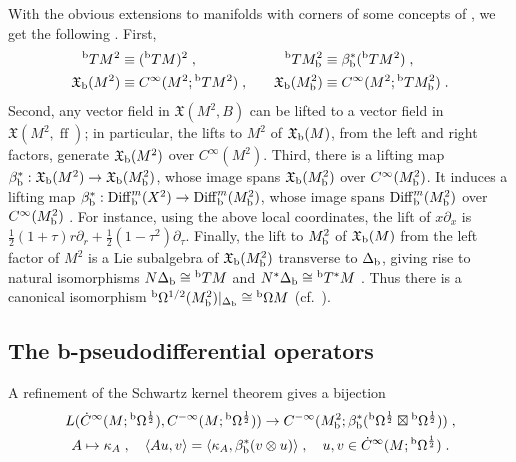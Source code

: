 \documentclass{memo-l}
\theoremstyle{plain}
\theoremstyle{definition}
\theoremstyle{remark}
\newcommand{\fX}{\mathfrak{X}}
\newcommand{\Diff}{\operatorname{Diff}}
\newcommand{\ff}{\operatorname{ff}}
\newcommand{\bOmega}{{}^{\text{\rm b}}\Omega}
\newcommand{\bT}{{}^{\text{\rm b}}T}
\newcommand{\Diffb}{\Diff_{\text{\rm b}}}
\newcommand{\Deltab}{\Delta_{\text{\rm b}}}
\newcommand{\fXb}{\fX_{\text{\rm b}}}
\numberwithin{section}{chapter}
\numberwithin{equation}{section}%
\begin{document}
With the obvious extensions to manifolds with corners of some concepts of , we get the following \cite[Section~4.5]{Melrose1993}. First,
\begin{alignat*}{2}
\bT M^2&\equiv(\bT M)^2\;,&\quad\bT M^2_{\text{\rm b}}&\equiv\beta_{\text{\rm b}}^*(\bT M^2)\;,\\
\fXb(M^2)&\equiv C^\infty(M^2;\bT M^2)\;,&\quad \fXb(M^2_{\text{\rm b}})&\equiv C^\infty(M^2;\bT M^2_{\text{\rm b}})\;. 
\end{alignat*}
Second, any vector field in $\fX(M^2,B)$ can be lifted to a vector field in $\fX(M^2,\ff)$; in particular, the lifts to $M^2$ of $\fXb(M)$, from the left and right factors, generate $\fXb(M^2)$ over $C^\infty(M^2)$. Third, there is a lifting map $\beta_{\text{\rm b}}^*:\fXb(M^2)\to\fXb(M^2_{\text{\rm b}})$, whose image spans $\fXb(M^2_{\text{\rm b}})$ over $C^\infty(M^2_{\text{\rm b}})$. It induces a lifting map $\beta_{\text{\rm b}}^*:\Diffb^m(X^2)\to\Diffb^m(M^2_{\text{\rm b}})$, whose image spans $\Diffb^m(M^2_{\text{\rm b}})$ over $C^\infty(M^2_{\text{\rm b}})$ \cite[Exercise~4.11]{Melrose1993}. For instance, using the above local coordinates, the lift of $x\partial_x$ is $\frac{1}{2}(1+\tau)r\partial_r+\frac{1}{2}(1-\tau^2)\partial_\tau$. Finally, the lift to $M^2_{\text{\rm b}}$ of $\fXb(M)$ from the left factor of $M^2$ is a Lie subalgebra of $\fXb(M^2_{\text{\rm b}})$ transverse to $\Deltab$, giving rise to natural isomorphisms $N\Deltab\cong\bT M$ and $N^*\Deltab\cong\bT ^*M$ \cite[Lemmas~4.5 and~4.6]{Melrose1993}. Thus there is a canonical isomorphism $\bOmega^{1/2}(M^2_{\text{\rm b}})|_{\Deltab}\cong\bOmega M$ (cf.\ \cite[Eq.~(4.125)]{Melrose1993}).



\subsection{The b-pseudodifferential operators}\label{ss: b-pseudodiff opers}

A refinement of the Schwartz kernel theorem gives a bijection \cite[Lemma~4.20]{Melrose1993}
\begin{gather*}
L(\dot C^\infty(M;\bOmega^{\frac12}),C^{-\infty}(M;\bOmega^{\frac12}))\to
C^{-\infty}(M^2_{\text{\rm b}}; \beta_{\text{\rm b}}^*(\bOmega^{\frac12}\boxtimes\bOmega^{\frac12}))\;,\\
A\mapsto\kappa_A\;,\quad\langle Au,v\rangle= \langle\kappa_A,\beta_{\text{\rm b}}^*(v\otimes u) \rangle\;,\quad
u,v\in\dot C^\infty(M;\bOmega^{\frac12})\;.
\end{gather*}
\end{document}
